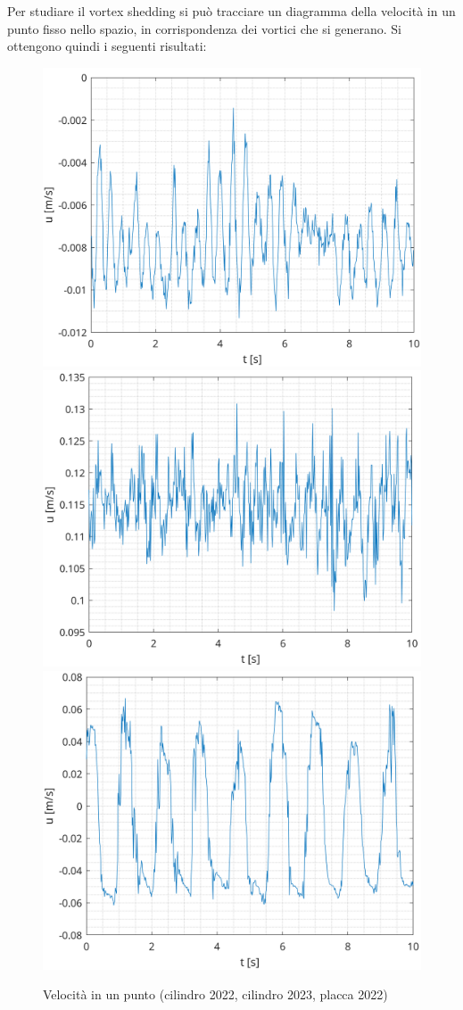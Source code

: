 \noindent Per studiare il vortex shedding si può tracciare un diagramma della velocità in un punto fisso nello spazio, in corrispondenza dei vortici che si generano. Si ottengono quindi i seguenti risultati:
\begin{figure}[H]
    \centering
    \includegraphics[width=.46\textwidth]{images/11/timeseries22.png}
    \includegraphics[width=.46\textwidth]{images/11/timeseries23.png}
    \includegraphics[width=.46\textwidth]{images/11/timeseries220.png}
    \caption{Velocità in un punto (cilindro 2022, cilindro 2023, placca 2022)}
\end{figure}


